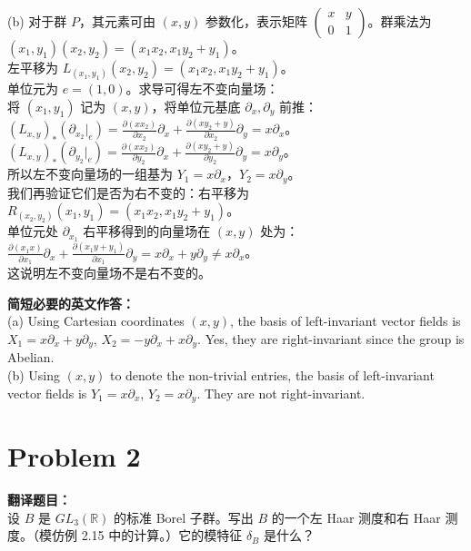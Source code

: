 \documentclass{ctexart}
\begin{document}
(b) 对于群 $P$，其元素可由 $(x, y)$ 参数化，表示矩阵 $\begin{pmatrix} x & y \\ 0 & 1 \end{pmatrix}$。群乘法为 $(x_1, y_1)(x_2, y_2) = (x_1 x_2, x_1 y_2 + y_1)$。\\
左平移为 $L_{(x_1, y_1)}(x_2, y_2) = (x_1 x_2, x_1 y_2 + y_1)$。\\
单位元为 $e=(1, 0)$。求导可得左不变向量场：\\
将 $(x_1, y_1)$ 记为 $(x, y)$，将单位元基底 $\partial_x, \partial_y$ 前推：\\
$(L_{x, y})_* (\partial_{x_2}|_e) = \frac{\partial(x x_2)}{\partial x_2} \partial_x + \frac{\partial(x y_2 + y)}{\partial x_2} \partial_y = x\partial_x$。\\
$(L_{x, y})_* (\partial_{y_2}|_e) = \frac{\partial(x x_2)}{\partial y_2} \partial_x + \frac{\partial(x y_2 + y)}{\partial y_2} \partial_y = x\partial_y$。\\
所以左不变向量场的一组基为 $Y_1 = x\partial_x$，$Y_2 = x\partial_y$。\\
我们再验证它们是否为右不变的：右平移为 $R_{(x_2, y_2)}(x_1, y_1) = (x_1 x_2, x_1 y_2 + y_1)$。\\
单位元处 $\partial_{x_1}$ 右平移得到的向量场在 $(x, y)$ 处为：$\frac{\partial(x_1 x)}{\partial x_1}\partial_x + \frac{\partial(x_1 y + y_1)}{\partial x_1}\partial_y = x\partial_x + y\partial_y \neq x\partial_x$。\\
这说明左不变向量场不是右不变的。

\vspace{1em}
\textbf{简短必要的英文作答：}\\
(a) Using Cartesian coordinates $(x,y)$, the basis of left-invariant vector fields is $X_1 = x\partial_x + y\partial_y$, $X_2 = -y\partial_x + x\partial_y$. Yes, they are right-invariant since the group is Abelian.\\
(b) Using $(x,y)$ to denote the non-trivial entries, the basis of left-invariant vector fields is $Y_1 = x\partial_x$, $Y_2 = x\partial_y$. They are not right-invariant.

\vspace{2em}
\section*{Problem 2}
\textbf{翻译题目：}\\
设 $B$ 是 $GL_3(\mathbb{R})$ 的标准 Borel 子群。写出 $B$ 的一个左 Haar 测度和右 Haar 测度。（模仿例 2.15 中的计算。）它的模特征 $\delta_B$ 是什么？
\end{document}
